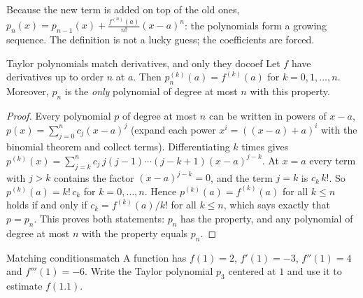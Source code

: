 \documentclass[11pt]{article}
\begin{document}
Because the new term is added on top of the old ones, $p_n(x)=p_{n-1}(x)+\frac{f^{(n)}(a)}{n!}(x-a)^n$: the polynomials form a growing sequence. The definition is not a lucky guess; the coefficients are forced.

\begin{thm}{Taylor polynomials match derivatives, and only they do}{coef}
Let $f$ have derivatives up to order $n$ at $a$. Then $p_n^{(k)}(a)=f^{(k)}(a)$ for $k=0,1,\dots,n$. Moreover, $p_n$ is the \emph{only} polynomial of degree at most $n$ with this property.
\end{thm}
\begin{proof}
Every polynomial $p$ of degree at most $n$ can be written in powers of $x-a$, $p(x)=\sum_{j=0}^nc_j(x-a)^j$ (expand each power $x^i=\left((x-a)+a\right)^i$ with the binomial theorem and collect terms). Differentiating $k$ times gives $p^{(k)}(x)=\sum_{j=k}^nc_j\,j(j-1)\cdots(j-k+1)(x-a)^{j-k}$. At $x=a$ every term with $j>k$ contains the factor $(x-a)^{j-k}=0$, and the term $j=k$ is $c_k\,k!$. So $p^{(k)}(a)=k!\,c_k$ for $k=0,\dots,n$. Hence $p^{(k)}(a)=f^{(k)}(a)$ for all $k\le n$ holds if and only if $c_k=f^{(k)}(a)/k!$ for all $k\le n$, which says exactly that $p=p_n$. This proves both statements: $p_n$ has the property, and any polynomial of degree at most $n$ with the property equals $p_n$.
\end{proof}

\begin{kc}{Matching conditions}{match}
A function has $f(1)=2$, $f'(1)=-3$, $f''(1)=4$ and $f'''(1)=-6$. Write the Taylor polynomial $p_3$ centered at $1$ and use it to estimate $f(1.1)$.
\end{kc}
\end{document}
